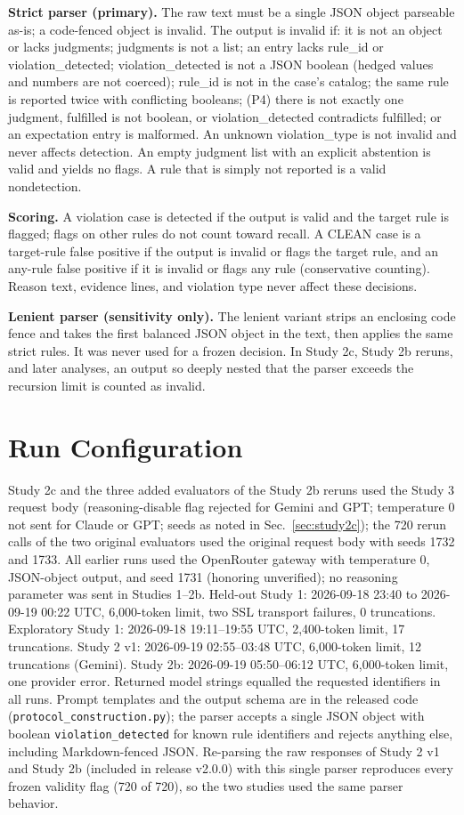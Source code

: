 \documentclass{ieeeaccess}
\newcommand{\code}[1]{\texttt{#1}}
\begin{document}
\textbf{Strict parser (primary).} The raw text must be a single JSON object parseable as-is; a code-fenced object is invalid. The output is invalid if: it is not an object or lacks judgments; judgments is not a list; an entry lacks rule\_id or violation\_detected; violation\_detected is not a JSON boolean (hedged values and numbers are not coerced); rule\_id is not in the case's catalog; the same rule is reported twice with conflicting booleans; (P4) there is not exactly one judgment, fulfilled is not boolean, or violation\_detected contradicts fulfilled; or an expectation entry is malformed. An unknown violation\_type is not invalid and never affects detection. An empty judgment list with an explicit abstention is valid and yields no flags. A rule that is simply not reported is a valid nondetection.

\textbf{Scoring.} A violation case is detected if the output is valid and the target rule is flagged; flags on other rules do not count toward recall. A CLEAN case is a target-rule false positive if the output is invalid or flags the target rule, and an any-rule false positive if it is invalid or flags any rule (conservative counting). Reason text, evidence lines, and violation type never affect these decisions.

\textbf{Lenient parser (sensitivity only).} The lenient variant strips an enclosing code fence and takes the first balanced JSON object in the text, then applies the same strict rules. It was never used for a frozen decision. In Study 2c, Study 2b reruns, and later analyses, an output so deeply nested that the parser exceeds the recursion limit is counted as invalid.

\section{Run Configuration}
\label{app:config}
Study 2c and the three added evaluators of the Study 2b reruns used the Study 3 request body (reasoning-disable flag rejected for Gemini and GPT; temperature 0 not sent for Claude or GPT; seeds as noted in Sec.~\ref{sec:study2c}); the 720 rerun calls of the two original evaluators used the original request body with seeds 1732 and 1733. All earlier runs used the OpenRouter gateway with temperature 0, JSON-object output, and seed 1731 (honoring unverified); no reasoning parameter was sent in Studies 1--2b. Held-out Study 1: 2026-09-18 23:40 to 2026-09-19 00:22 UTC, 6,000-token limit, two SSL transport failures, 0 truncations. Exploratory Study 1: 2026-09-18 19:11--19:55 UTC, 2,400-token limit, 17 truncations. Study 2 v1: 2026-09-19 02:55--03:48 UTC, 6,000-token limit, 12 truncations (Gemini). Study 2b: 2026-09-19 05:50--06:12 UTC, 6,000-token limit, one provider error. Returned model strings equalled the requested identifiers in all runs. Prompt templates and the output schema are in the released code (\code{protocol\_construction.py}); the parser accepts a single JSON object with boolean \code{violation\_detected} for known rule identifiers and rejects anything else, including Markdown-fenced JSON. Re-parsing the raw responses of Study 2 v1 and Study 2b (included in release v2.0.0) with this single parser reproduces every frozen validity flag (720 of 720), so the two studies used the same parser behavior.
\end{document}
